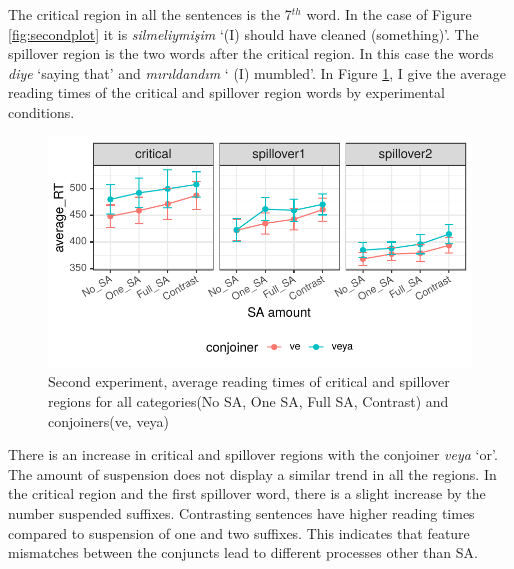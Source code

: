 The critical region in all the sentences is the 7$^{th}$ word. In the case of Figure \ref{fig:secondplot} it is \textit{silmeliymişim} `(I) should have cleaned (something)'. The spillover region is the two words after the critical region. In this case the words \textit{diye} `saying that' and \textit{mırıldandım} ` (I) mumbled'. In Figure \ref{fig:thirdplot}, I give the average reading times of the critical and spillover region words by experimental conditions.

\begin{knitrout}
\color{fgcolor}\begin{figure}[hbt!]

{\centering \includegraphics[]{experiments/selfpaced/report/figure/thirdplot-1.pdf} 

}

\caption[Second experiment, average reading times of critical and spillover regions for all categories(No SA, One SA, Full SA, Contrast) and conjoiners(ve, veya)]{Second experiment, average reading times of critical and spillover regions for all categories(No SA, One SA, Full SA, Contrast) and conjoiners(ve, veya)}\label{fig:thirdplot}
\end{figure}


\end{knitrout}

There is an increase in critical and spillover regions with the conjoiner \textit{veya} `or'. The amount of suspension does not display a similar trend in all the regions. In the critical region and the first spillover word, there is a slight increase by the number suspended suffixes. Contrasting sentences have higher reading times compared to suspension of one and two suffixes. This indicates that feature mismatches between the conjuncts lead to different processes other than SA.

